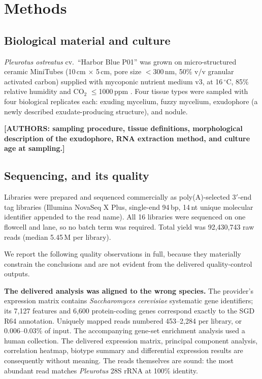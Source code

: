 \section{Methods}

\subsection{Biological material and culture}
\textit{Pleurotus ostreatus} cv.\ ``Harbor Blue P01'' was grown on micro-structured ceramic
MiniTubes (10\,cm $\times$ 5\,cm, pore size $<$300\,nm, 50\% v/v granular activated carbon)
supplied with mycoponic nutrient medium v3, at 16\,$^\circ$C, 85\% relative humidity and
CO$_2$ $\leq$1000\,ppm \cite{porterfield2026mycoponics}. Four tissue types were sampled with
four biological replicates each: exuding mycelium, fuzzy mycelium, exudophore (a newly
described exudate-producing structure), and nodule.

\noindent\textbf{[AUTHORS: sampling procedure, tissue definitions, morphological description
of the exudophore, RNA extraction method, and culture age at sampling.]}

\subsection{Sequencing, and its quality}\label{sec:seqqual}
Libraries were prepared and sequenced commercially as poly(A)-selected 3$'$-end tag libraries
(Illumina NovaSeq X Plus, single-end 94\,bp, 14\,nt unique molecular identifier appended to the
read name). All 16 libraries were sequenced on one flowcell and lane, so no batch term was
required. Total yield was 92,430,743 raw reads (median 5.45\,M per library).

We report the following quality observations in full, because they materially constrain the
conclusions and are not evident from the delivered quality-control outputs.

\textbf{The delivered analysis was aligned to the wrong species.} The provider's expression
matrix contains \textit{Saccharomyces cerevisiae} systematic gene identifiers; its 7,127
features and 6,600 protein-coding genes correspond exactly to the SGD R64 annotation. Uniquely
mapped reads numbered 453--2,284 per library, or 0.006--0.03\% of input. The accompanying
gene-set enrichment analysis used a human collection. The delivered expression matrix,
principal component analysis, correlation heatmap, biotype summary and differential expression
results are consequently without meaning. The reads themselves are sound: the most abundant
read matches \textit{Pleurotus} 28S rRNA at 100\% identity.

